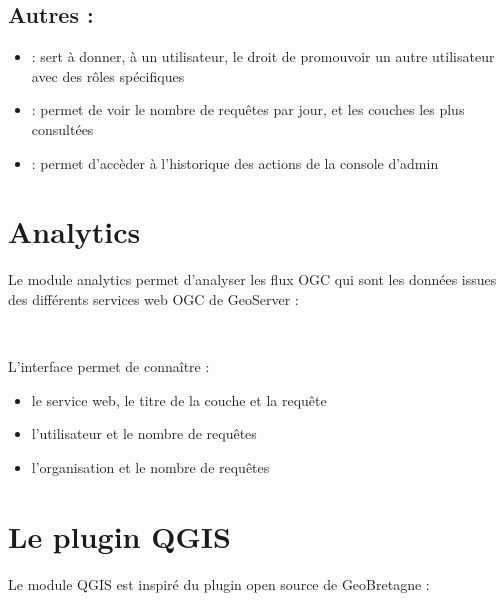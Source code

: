 \documentclass[letterpaper,10pt,french]{sphinxmanual}
\let\sphinxpxdimen\pdfpxdimen\else\newdimen\sphinxpxdimen
\begin{document}
\subsection{Autres :}
\label{\detokenize{doc_admin/utilisateurs:autres}}\begin{itemize}
\item {} 
\sphinxAtStartPar
{} : sert à donner, à un utilisateur, le droit de promouvoir un autre utilisateur avec des rôles spécifiques

\item {} 
\sphinxAtStartPar
{} : permet de voir le nombre de requêtes par jour, et les couches les plus consultées

\item {} 
\sphinxAtStartPar
{} : permet d’accèder à l’historique des actions de la console d’admin

\end{itemize}

\sphinxstepscope


\section{Analytics}
\label{\detokenize{doc_admin/analytics:analytics}}\label{\detokenize{doc_admin/analytics::doc}}
\sphinxAtStartPar
Le module analytics permet d’analyser les flux OGC qui sont les données issues des différents services web OGC de GeoServer :

\noindent{\hspace*{\fill}\sphinxincludegraphics[width=700\sphinxpxdimen]{{ana}.png}\hspace*{\fill}}

\sphinxAtStartPar
 

\sphinxAtStartPar
L’interface permet de connaître :
\begin{itemize}
\item {} 
\sphinxAtStartPar
le service web, le titre de la couche et la requête

\item {} 
\sphinxAtStartPar
l’utilisateur et le nombre de requêtes

\item {} 
\sphinxAtStartPar
l’organisation et le nombre de requêtes

\end{itemize}

\sphinxstepscope


\section{Le plugin QGIS}
\label{\detokenize{doc_admin/qgis:le-plugin-qgis}}\label{\detokenize{doc_admin/qgis::doc}}
\sphinxAtStartPar
Le module QGIS est inspiré du plugin open source de GeoBretagne : 
\end{document}
